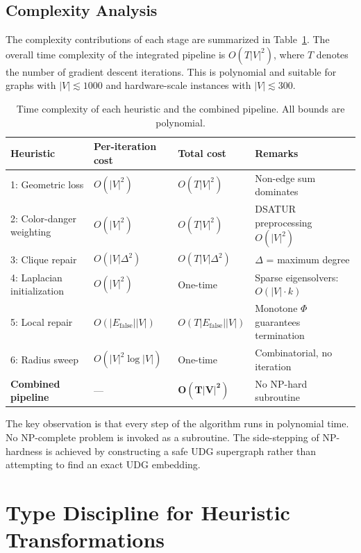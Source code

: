 \documentclass[11pt]{article}
\newcommand{\Efalse}{E_{\mathrm{false}}}
\begin{document}
\subsection{Complexity Analysis}

The complexity contributions of each stage are summarized in Table~\ref{tab:complexity}. The overall time complexity of the integrated pipeline is $O(T|V|^2)$, where $T$ denotes the number of gradient descent iterations. This is polynomial and suitable for graphs with $|V| \lesssim 1000$ and hardware-scale instances with $|V| \lesssim 300$.

\begin{table}[h]
\centering
\caption{Time complexity of each heuristic and the combined pipeline. All bounds are polynomial.}
\label{tab:complexity}
\begin{tabular}{@{}llll@{}}
\toprule
Heuristic & Per-iteration cost & Total cost & Remarks \\
\midrule
1: Geometric loss & $O(|V|^2)$ & $O(T|V|^2)$ & Non-edge sum dominates \\
2: Color-danger weighting & $O(|V|^2)$ & $O(T|V|^2)$ & DSATUR preprocessing $O(|V|^2)$ \\
3: Clique repair & $O(|V|\Delta^2)$ & $O(T|V|\Delta^2)$ & $\Delta$ = maximum degree \\
4: Laplacian initialization & $O(|V|^2)$ & One-time & Sparse eigensolvers: $O(|V|\cdot k)$ \\
5: Local repair & $O(|\Efalse||V|)$ & $O(T|\Efalse||V|)$ & Monotone $\Phi$ guarantees termination \\
6: Radius sweep & $O(|V|^2\log|V|)$ & One-time & Combinatorial, no iteration \\
\midrule
\textbf{Combined pipeline} & --- & $\mathbf{O(T|V|^2)}$ & No NP-hard subroutine \\
\bottomrule
\end{tabular}
\end{table}

The key observation is that every step of the algorithm runs in polynomial time. No NP-complete problem is invoked as a subroutine. The side-stepping of NP-hardness is achieved by constructing a safe UDG supergraph rather than attempting to find an exact UDG embedding.

\section{Type Discipline for Heuristic Transformations}
\end{document}
